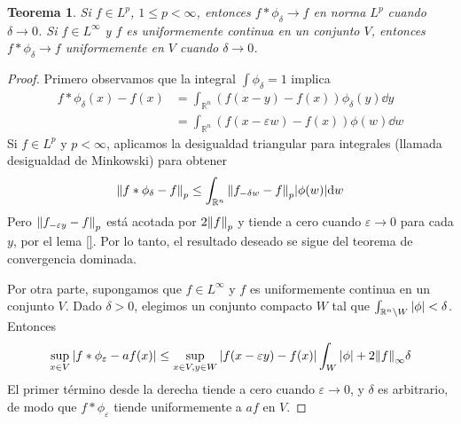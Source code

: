 \documentclass{article}
\newcommand{\realNumbers}{\mathbb{R}}
\newtheorem{theorem}{Teorema}
\theoremstyle{remark}
\begin{document}
\begin{theorem}
  Si \(f \in L^p\), \(1 \leq p < \infty\), entonces \(f * \phi_{\delta} \rightarrow f\) en norma \(L^p\) cuando \(\delta \rightarrow 0\).
  Si \(f \in L^{\infty}\) y \(f\) es uniformemente continua en un conjunto \(V\), entonces \(f * \phi_{\delta} \rightarrow f\) uniformemente en \(V\) cuando \(\delta \rightarrow 0\).
\end{theorem}
\begin{proof}
  Primero observamos que la integral \(\int \phi_{\delta} = 1\) implica
  \begin{align}
    f * \phi_{\delta} (x) - f(x)
    &=
    \int_{\realNumbers^n} (f(x - y) - f(x)) \phi_{\delta}(y) \dd y
    \\
    &=
    \int_{\realNumbers^n} (f(x - \varepsilon w) - f(x)) \phi(w) \dd w
  \end{align}
  Si \(f \in L^p\) y \(p < \infty\), aplicamos la desigualdad triangular para integrales (llamada desigualdad de Minkowski) para obtener
  \begin{align}
    \norm{f * \phi_{\delta} - f}_p
    \leq
    \int_{\realNumbers^n} \norm{f_{- \delta w} - f}_p \abs{\phi(w)} \dd w
  \end{align}
  Pero \(\norm{f_{- \varepsilon y} - f}_p\) está acotada por \(2 \norm{f}_p\) y tiende a cero cuando \(\varepsilon \rightarrow 0\) para cada \(y\), por el lema \ref{}.
  Por lo tanto, el resultado deseado se sigue del teorema de convergencia dominada.

  Por otra parte, supongamos que \(f \in L^{\infty}\) y \(f\) es uniformemente continua en un conjunto \(V\).
  Dado \(\delta > 0\), elegimos un conjunto compacto \(W\) tal que \(\int_{\realNumbers^n \setminus W} \abs{\phi} < \delta\).
  Entonces
  \begin{align}
    \sup_{x \in V} \abs{f * \phi_{\varepsilon} - a f(x)}
    \leq
    \sup_{x \in V, y \in W} \abs{f(x - \varepsilon y) - f(x)} \int_W \abs{\phi} + 2 \norm{f}_{\infty} \delta
  \end{align}
  El primer término desde la derecha tiende a cero cuando \(\varepsilon \rightarrow 0\), y \(\delta\) es arbitrario, de modo que \(f * \phi_{\varepsilon}\) tiende uniformemente a \(a f\) en \(V\).
\end{proof}
\end{document}
